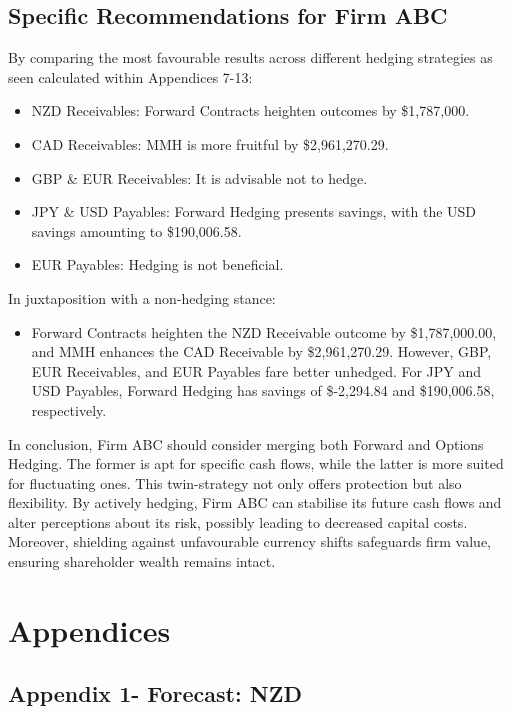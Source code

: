 \documentclass{article}
\let\Oldsubsection\subsection
\renewcommand{\subsection}{\FloatBarrier\Oldsubsection}
\begin{document}
\subsection*{Specific Recommendations for Firm ABC}
\noindent By comparing the most favourable results across different hedging strategies as seen calculated within Appendices 7-13:
\begin{itemize}
    \item NZD Receivables: Forward Contracts heighten outcomes by \$1,787,000.
    \item CAD Receivables: MMH is more fruitful by \$2,961,270.29.
    \item GBP \& EUR Receivables: It is advisable not to hedge.
    \item JPY \& USD Payables: Forward Hedging presents savings, with the USD savings amounting to \$190,006.58.
    \item EUR Payables: Hedging is not beneficial.\\
\end{itemize}

\noindent In juxtaposition with a non-hedging stance:
\begin{itemize}
    \item Forward Contracts heighten the NZD Receivable outcome by \$1,787,000.00, and MMH enhances the CAD Receivable by \$2,961,270.29. However, GBP, EUR Receivables, and EUR Payables fare better unhedged. For JPY and USD Payables, Forward Hedging has savings of \$-2,294.84 and \$190,006.58, respectively.\\
\end{itemize}

\noindent In conclusion, Firm ABC should consider merging both Forward and Options Hedging. The former is apt for specific cash flows, while the latter is more suited for fluctuating ones. This twin-strategy not only offers protection but also flexibility. By actively hedging, Firm ABC can stabilise its future cash flows and alter perceptions about its risk, possibly leading to decreased capital costs. Moreover, shielding against unfavourable currency shifts safeguards firm value, ensuring shareholder wealth remains intact.\\

\section*{Appendices}

\subsection*{Appendix 1- Forecast: NZD}
\end{document}
